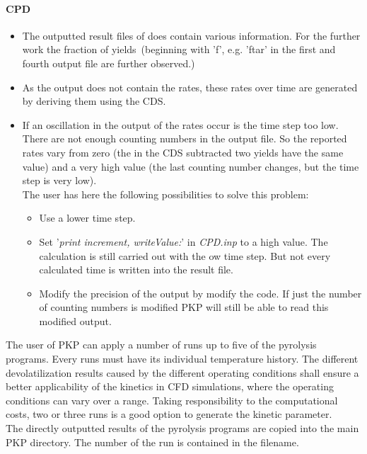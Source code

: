 \paragraph{CPD}
\begin{itemize}
 \item The outputted result files of \CPD does contain various information. For the further work the fraction of yields~(beginning with 'f', e.g. 'ftar' in the first and fourth \CPD output file are further observed.)
 \item As the \CPD output does not contain the rates, these rates over time are generated by deriving them using the CDS.
 \item If an oscillation in the output of the rates occur is the time step too low. There are not enough counting numbers in the output file. So the reported rates vary from zero (the in the CDS subtracted two yields have the same value) and a very high value (the last counting number changes, but the time step is very low).\\
 The user has here the following possibilities to solve this problem:
 \begin{itemize}
  \item Use a lower time step.
  \item Set '\textit{print increment, writeValue:}' in \emph{CPD.inp} to a high value. The calculation is still carried out with the ow time step. But not every calculated time is written into the result file.
  \item Modify the precision of the \CPD output by modify the \CPD code. If just the number of counting numbers is modified PKP will still be able to read this modified output.
 \end{itemize}
\end{itemize}

The user of PKP can apply a number of runs up to five of the pyrolysis programs. Every runs must have its individual temperature history. The different devolatilization results caused by the different operating conditions shall ensure a better applicability of the kinetics in CFD simulations, where the operating conditions can vary over a range. Taking responsibility to the computational costs, two or three runs is a good option to generate the kinetic parameter.\\

The directly outputted results of the pyrolysis programs are copied into the main PKP directory. The number of the run is contained in the filename.\\

